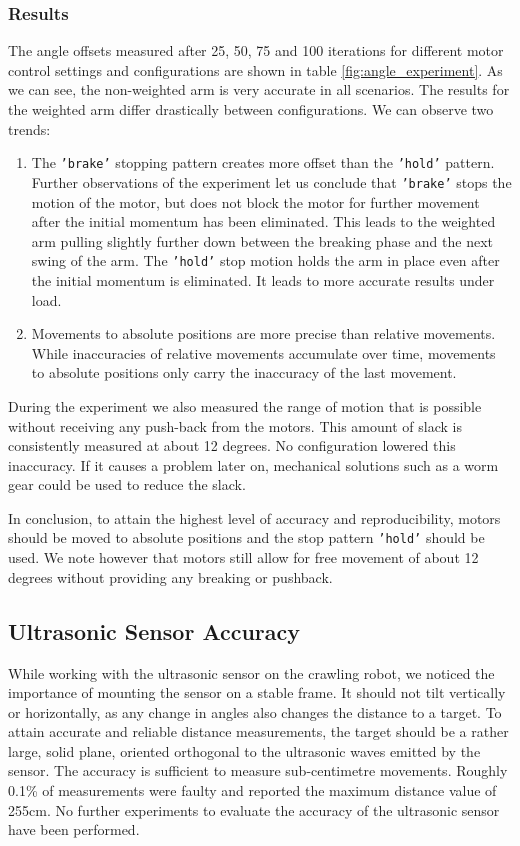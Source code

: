 \documentclass[11pt, a4paper]{article}
\begin{document}
	\subsubsection*{Results}
	The angle offsets measured after 25, 50, 75 and 100 iterations for different motor control settings and configurations are shown in table \ref{fig:angle_experiment}. As we can see, the non-weighted arm is very accurate in all scenarios. The results for the weighted arm differ drastically between configurations. We can observe two trends:
	\begin{enumerate}
		\item The \texttt{'brake'} stopping pattern creates more offset than the \texttt{'hold'} pattern. Further observations of the experiment let us conclude that \texttt{'brake'} stops the motion of the motor, but does not block the motor for further movement after the initial momentum has been eliminated. This leads to the weighted arm pulling slightly further down between the breaking phase and the next swing of the arm. The \texttt{'hold'} stop motion holds the arm in place even after the initial momentum is eliminated. It leads to more accurate results under load.
		\item Movements to absolute positions are more precise than relative movements. While inaccuracies of relative movements accumulate over time, movements to absolute positions only carry the inaccuracy of the last movement.
	\end{enumerate}
	During the experiment we also measured the range of motion that is possible without receiving any push-back from the motors. This amount of slack is consistently measured at about 12 degrees. No configuration lowered this inaccuracy. If it causes a problem later on, mechanical solutions such as a worm gear could be used to reduce the slack.
	
	\bigskip
	In conclusion, to attain the highest level of accuracy and reproducibility, motors should be moved to absolute positions and the stop pattern \texttt{'hold'} should be used. We note however that motors still allow for free movement of about 12 degrees without providing any breaking or pushback.
	
	\subsection{Ultrasonic Sensor Accuracy}
	While working with the ultrasonic sensor on the crawling robot, we noticed the importance of mounting the sensor on a stable frame. It should not tilt vertically or horizontally, as any change in angles also changes the distance to a target. To attain accurate and reliable distance measurements, the target should be a rather large, solid plane, oriented orthogonal to the ultrasonic waves emitted by the sensor. The accuracy is sufficient to measure sub-centimetre movements. Roughly 0.1\% of measurements were faulty and reported the maximum distance value of 255cm. No further experiments to evaluate the accuracy of the ultrasonic sensor have been performed.
	
\end{document}
